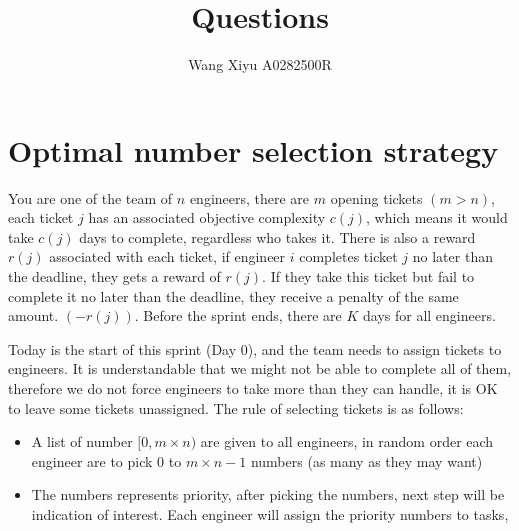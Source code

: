 \documentclass{article}
\begin{document}
\title{Questions}
\author{Wang Xiyu A0282500R}
\date{}
\maketitle
\tableofcontents

\section{Optimal number selection strategy}
You are one of the team of $n$ engineers, there are $m$ opening tickets $(m > n)$, each ticket $j$ has an associated objective complexity $c(j)$, which means it would take $c(j)$ 
days to complete, regardless who takes it. There is also a reward $r(j)$ associated with each ticket, if engineer $i$ completes ticket $j$ no later than the deadline, they gets a 
reward of $r(j)$. If they take this ticket but fail to complete it no later than the deadline, they receive a penalty of the same amount. $(-r(j))$. Before the sprint ends, there are 
$K$ days for all engineers. 

Today is the start of this sprint (Day 0), and the team needs to assign tickets to engineers. It is understandable that we might not be able to complete all of them, therefore we do 
not force engineers to take more than they can handle, it is OK to leave some tickets unassigned. The rule of selecting tickets is as follows: 
\begin{itemize}
    \item A list of number $[0, m\times n)$ are given to all engineers, in random order each engineer are to pick $0$ to $m \times n -1$ numbers (as many as they may want)
    \item The numbers represents priority, after picking the numbers, next step will be indication of interest. Each engineer will assign the priority numbers to tasks, 
\end{itemize}
\end{document}
